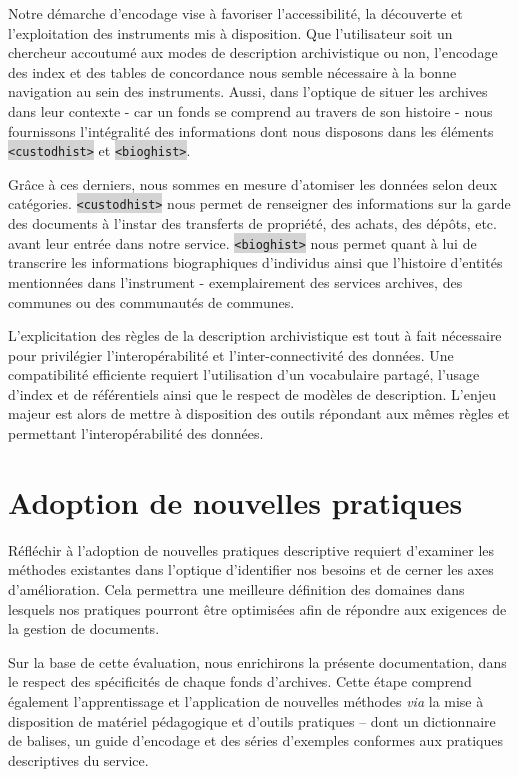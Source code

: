 \documentclass[hidelinks, 13pt]{report}
\newcommand{\code}[1]{\colorbox{LightGray}{\texttt{#1}}}
\begin{document}
	Notre démarche d’encodage vise à favoriser l’accessibilité, la découverte et l’exploitation des instruments mis à disposition. Que l’utilisateur soit un chercheur accoutumé aux modes de description archivistique ou non, l’encodage des index et des tables de concordance nous semble nécessaire à la bonne navigation au sein des instruments. Aussi, dans l’optique de situer les archives dans leur contexte - car un fonds se comprend au travers de son histoire - nous fournissons l’intégralité des informations dont nous disposons dans les éléments \code{<custodhist>} et \code{<bioghist>}. 
	
	Grâce à ces derniers, nous sommes en mesure d’atomiser les données selon deux catégories. \code{<custodhist>} nous permet de renseigner des informations sur la garde des documents à l’instar des transferts de propriété, des achats, des dépôts, etc. avant leur entrée dans notre service. \code{<bioghist>} nous permet quant à lui de transcrire les informations biographiques d’individus ainsi que l’histoire d’entités mentionnées dans l’instrument - exemplairement des services archives, des communes ou des communautés de communes.
	
	L’explicitation des règles de la description archivistique est tout à fait nécessaire pour privilégier l’interopérabilité et l’inter-connectivité des données. Une compatibilité efficiente requiert l’utilisation d’un vocabulaire partagé, l’usage d’index et de référentiels ainsi que le respect de modèles de description. L’enjeu majeur est alors de mettre à disposition des outils répondant aux mêmes règles et permettant l’interopérabilité des données.
	
	
	
	
	
	
	
	
	
	
	\chapter{Adoption de nouvelles pratiques}
	
	Réfléchir à l'adoption de nouvelles pratiques descriptive requiert d'examiner les méthodes existantes dans l'optique d'identifier nos besoins et de cerner les axes d'amélioration. Cela permettra une meilleure définition des domaines dans lesquels nos pratiques pourront être optimisées afin de répondre aux exigences de la gestion de documents.
	
	Sur la base de cette évaluation, nous enrichirons la présente documentation, dans le respect des spécificités de chaque fonds d'archives. Cette étape comprend également l'apprentissage et l'application de nouvelles méthodes \textit{via} la mise à disposition de matériel pédagogique et d'outils pratiques -- dont un dictionnaire de balises, un guide d'encodage et des séries d'exemples conformes aux pratiques descriptives du service.
	
\end{document}
